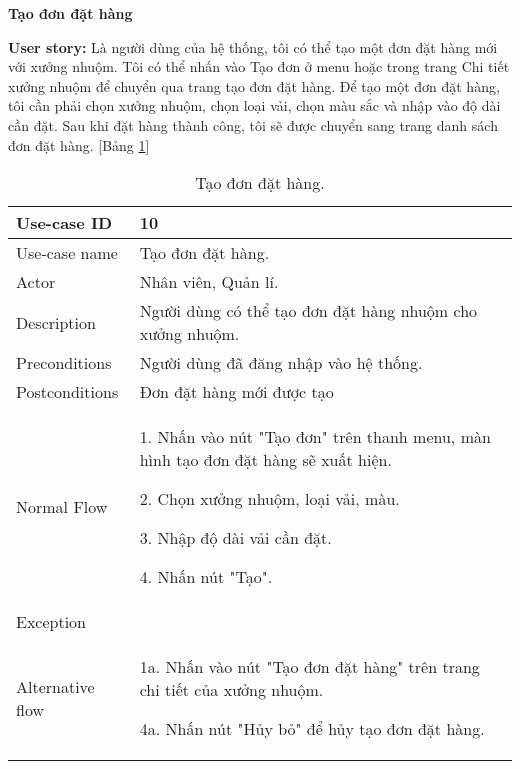 \textbf{Tạo đơn đặt hàng}\par
\textbf{User story:} Là người dùng của hệ thống, tôi có thể tạo một đơn đặt hàng mới với xưởng nhuộm. Tôi có thể nhấn vào Tạo đơn ở menu hoặc trong trang Chi tiết xưởng nhuộm để chuyển qua trang tạo đơn đặt hàng. Để tạo một đơn đặt hàng, tôi cần phải chọn xưởng nhuộm, chọn loại vải, chọn màu sắc và nhập vào độ dài cần đặt. Sau khi đặt hàng thành công, tôi sẽ được chuyển sang trang danh sách đơn đặt hàng. [Bảng \ref{bang7}]
\begin{table}[H]
    \centering
    \begin{tabular}{|m{3cm}|m{10cm}|}
    \hline 
        Use-case ID & 10\\ \hline
        Use-case name & Tạo đơn đặt hàng.\\ \hline
        Actor & Nhân viên, Quản lí.\\ \hline
        Description & Người dùng có thể tạo đơn đặt hàng nhuộm cho xưởng nhuộm.\\ \hline
        Preconditions & Người dùng đã đăng nhập vào hệ thống.\\ \hline
        Postconditions & Đơn đặt hàng mới được tạo\\ \hline
        Normal Flow & 
        1. Nhấn vào nút "Tạo đơn" trên thanh menu, màn hình tạo đơn đặt hàng sẽ xuất hiện.\par
        2. Chọn xưởng nhuộm, loại vải, màu.\par
        3. Nhập độ dài vải cần đặt.\par
        4. Nhấn nút "Tạo".
        \\ \hline
        Exception & \\ \hline
        Alternative flow & 
        1a. Nhấn vào nút "Tạo đơn đặt hàng" trên trang chi tiết của xưởng nhuộm.\par
        4a. Nhấn nút "Hủy bỏ" để hủy tạo đơn đặt hàng.
        \\ 
    \hline 
    \end{tabular}
    \caption{Tạo đơn đặt hàng.}
    \label{bang7}
\end{table}

